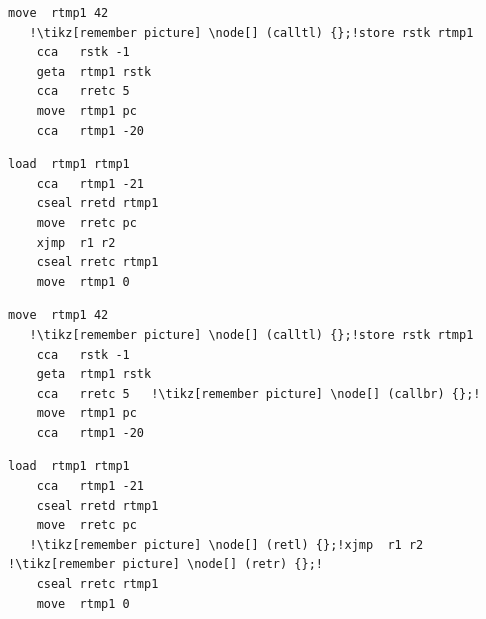 \documentclass[14pt]{beamer}
\begin{document}
\newsavebox{\syntaxplain}
\begin{lrbox}{\syntaxplain}
\begin{minipage}{2.5cm}
\begin{lstlisting}[basicstyle=\tiny\ttfamily,escapechar=!]
    move  rtmp1 42
   !\tikz[remember picture] \node[] (calltl) {};!store rstk rtmp1
    cca   rstk -1
    geta  rtmp1 rstk
    cca   rretc 5
    move  rtmp1 pc
    cca   rtmp1 -20
\end{lstlisting}
\end{minipage}
\begin{minipage}{2.5cm}
\begin{lstlisting}[basicstyle=\tiny\ttfamily,escapechar=!]
    load  rtmp1 rtmp1
    cca   rtmp1 -21
    cseal rretd rtmp1
    move  rretc pc
    xjmp  r1 r2
    cseal rretc rtmp1
    move  rtmp1 0
  \end{lstlisting}
\end{minipage}
\end{lrbox}

\newsavebox{\syntax}
\begin{lrbox}{\syntax}
\begin{minipage}{2.5cm}
\begin{lstlisting}[basicstyle=\tiny\ttfamily,escapechar=!]
    move  rtmp1 42
   !\tikz[remember picture] \node[] (calltl) {};!store rstk rtmp1
    cca   rstk -1
    geta  rtmp1 rstk
    cca   rretc 5   !\tikz[remember picture] \node[] (callbr) {};!
    move  rtmp1 pc
    cca   rtmp1 -20
\end{lstlisting}
\end{minipage}
\begin{minipage}{2.5cm}
\begin{lstlisting}[basicstyle=\tiny\ttfamily,escapechar=!]
    load  rtmp1 rtmp1
    cca   rtmp1 -21
    cseal rretd rtmp1
    move  rretc pc
   !\tikz[remember picture] \node[] (retl) {};!xjmp  r1 r2 !\tikz[remember picture] \node[] (retr) {};!
    cseal rretc rtmp1
    move  rtmp1 0
  \end{lstlisting}
\end{minipage}

\end{lrbox}
\end{document}
